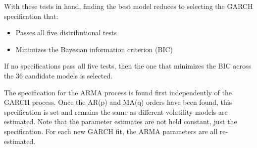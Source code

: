 \documentclass[12pt]{report}
\begin{document}
\begin{enumerate}
    With these tests in hand, finding the best model reduces to selecting the GARCH specification that:
    
    \begin{itemize}
        \item Passes all five distributional tests
        \item Minimizes the Bayesian information criterion (BIC)
    \end{itemize}

    If no specifications pass all five tests, then the one that minimizes the BIC across the 36 candidate models is selected.

\end{enumerate}

The specification for the ARMA process is found first independently of the GARCH process. Once the AR(p) and MA(q) orders have been found, this specification is set and remains the same as different volatility models are estimated. Note that the parameter estimates are not held constant, just the specification. For each new GARCH fit, the ARMA parameters are all re-estimated.

\printbibliography
\end{document}

